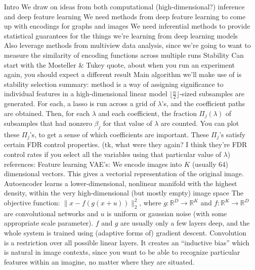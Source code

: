 \documentclass[11pt]{article}
\begin{document}
\begin{outline}
\1 Intro
  \2 We draw on ideas from both computational (high-dimensional?) inference and
  deep feature learning
    \3 We need methods from deep feature learning to come up with encodings for
    graphs and images
    \3 We need inferential methods to provide statistical guarantees for the
    things we're learning from deep learning models
  \2 Also leverage methods from multiview data analysis, since we're going to
  want to measure the similarity of encoding functions across multiple runs
\1 Stability
  \2 Can start with the Mosteller \& Tukey quote, about when you run an
  experiment again, you should expect a different result
  \2 Main algorithm we'll make use of is stability selection
    \3 summary: method is a way of assigning significance to individual features
    in a high-dimensional linear model
    \3 $\lfloor \frac{n}{2} \rfloor$-sized subsamples are generated. For each, a
    lasso is run across a grid of $\lambda$'s, and the coefficient paths are
    obtained. Then, for each $\lambda$ and each coefficient, the fraction
    $\Pi_{j}\left(\lambda\right)$ of subsamples that had nonzero $\beta_{j}$ for
    that value of $\lambda$ are counted. You can plot these $\Pi_{j}$'s, to get
    a sense of which coefficients are important.
    \3 These $\Pi_{j}$'s satisfy certain FDR control properties. (tk, what were
    they again? I think they're FDR control rates if you select all the
    variables using that particular value of $\lambda$)
  \2 references: \citep{mosteller1977data, yu2013stability, meinshausen2010stability}
\1 Feature learning
  \2 VAE's: We encode images into $K$ (usually 64) dimensional vectors. This
  gives a vectorial representation of the original image.
    \3 Autoencoder learns a lower-dimensional, nonlinear manifold with the
    highest density, within the very high-dimensional (but mostly empty) image
    space
    \3 The objective function: $\|x - f\left(g\left(x +
    u\right)\right)\|_{2}^{2}$, where $g : \mathbb{R}^{D} \to \mathbb{R}^{K}$
    and $f: \mathbb{R}^{K} \to \mathbb{R}^{D}$ are convolutional networks and
    $u$ is uniform or gaussian noise (with some appropriate scale parameter).
    \3 $f$ and $g$ are usually only a few layers deep, and the whole system is
    trained using (adaptive forms of) gradient descent.
    \3 Convolution is a restriction over all possible linear layers. It creates
    an ``inductive bias'' which is natural in image contexts, since you want to
    be able to recognize particular features within an imagine, no matter where
    they are situated.

\end{outline}
\end{document}

